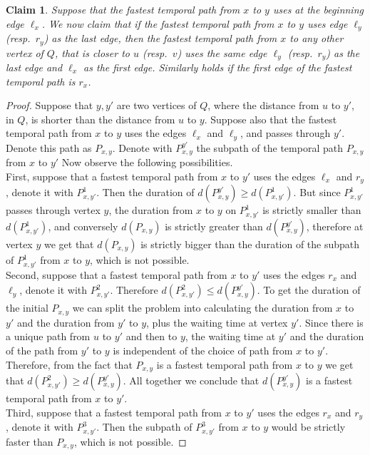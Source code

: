 \documentclass[11pt,a4paper]{article}
\newtheorem{claim}[theorem]{Claim}
\theoremstyle{remark}
\theoremstyle{definition}
\begin{document}
\begin{claim}\label{claim:FPT-unlabeldPaths-012}
    Suppose that the fastest temporal path from $x$ to $y$ uses at the beginning edge $\ell_x$.
    We now claim that if the fastest temporal path from $x$ to $y$ uses edge $\ell_y$ (resp.~$r_y$) as the last edge,
    then the fastest temporal path from $x$ to any other vertex of $Q$, that is closer to $u$ (resp.~$v$) 
    uses the same edge $\ell_y$ (resp.~$r_y$) as the last edge and $\ell_x$ as the first edge.
    Similarly holds if the first edge of the fastest temporal path is $r_x$.
\end{claim}
\begin{proof}
    Suppose that $y, y'$ are two vertices of $Q$, where the distance from $u$ to $y'$, in $Q$, is shorter than the distance from $u$ to $y$.
    Suppose also that the fastest temporal path from $x$ to $y$ uses the edges $\ell_x$ and $\ell_y$, and passes through $y'$. Denote this path as $P_{x,y}$.
    Denote with $P_{x,y}^{y'}$ the subpath of the temporal path $P_{x,y}$ from $x$ to $y'$
    Now observe the following possibilities. %
    \\
    First, suppose that a fastest temporal path from $x$ to $y'$ uses the edges $\ell_x$ and $r_y$, denote it with $P_{x,y'}^1$.
    Then the duration of $d(P_{x,y}^{y'}) \geq  d(P_{x,y'}^1)$.
    But since $P_{x,y'}^1$ passes through vertex $y$, the duration from $x$ to $y$ on $P_{x,y'}^1$ is strictly smaller than $d(P_{x,y'}^1)$, and conversely 
    $d(P_{x,y})$ is strictly greater than $d(P_{x,y}^{y'})$,
    therefore at vertex $y$ we get that 
    $d(P_{x,y})$ is strictly bigger than the duration of the subpath of $P_{x,y'}^1$ from $x$ to $y$, which is not possible. %
    \\
    Second, suppose that a fastest temporal path from $x$ to $y'$ uses the edges $r_x$ and $\ell_y$, denote it with $P_{x,y'}^2$.
    Therefore $d(P_{x,y'}^2) \leq d(P_{x,y}^{y'})$.
    To get the duration of the initial $P_{x,y}$ we can split the problem into calculating the duration from $x$ to $y'$ and the duration from $y'$ to $y$, plus the waiting time at vertex $y'$.
    Since there is a unique path from $u$ to $y'$ and then to $y$, the waiting time at $y'$ and the duration of the path from $y'$ to $y$ is independent of the choice of path from $x$ to $y'$. 
    Therefore, from the fact that $P_{x,y}$ is a fastest temporal path from $x$ to $y$ we get that $d(P_{x,y'}^2) \geq d(P_{x,y}^{y'})$.
    All together we conclude that $d(P_{x,y}^{y'})$ is a fastest temporal path from $x$ to $y'$.%
    \\
    Third, suppose that a fastest temporal path from $x$ to $y'$ uses the edges $r_x$ and $r_y$, denote it with $P_{x,y'}^3$.
    Then the subpath of $P_{x,y'}^3$ from $x$ to $y$ would be strictly faster than $P_{x,y}$, which is not possible.
\end{proof}
\end{document}

